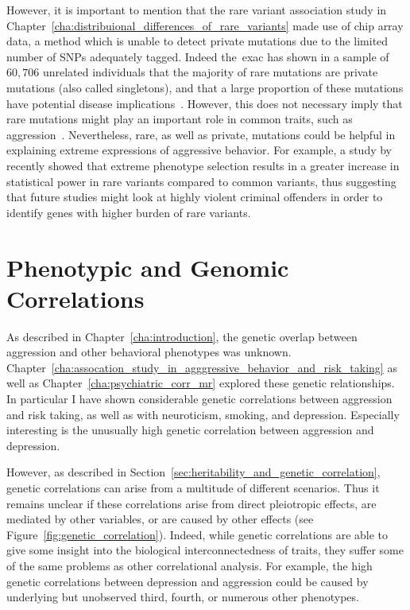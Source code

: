 However, it is important to mention that the rare variant association study in Chapter~\ref{cha:distribuional_differences_of_rare_variants} made use of chip array data, a method which is unable to detect private mutations due to the limited number of SNPs adequately tagged.
Indeed the~\acrfull{exac} has shown in a sample of $60,706$ unrelated individuals that the majority of rare mutations are private mutations (also called singletons), and that a large proportion of these mutations have potential disease implications~\cite{Lek2016,Kobayashi2017}.
However, this does not necessary imply that rare mutations might play an important role in common traits, such as aggression~\cite{Chabris2015}.
Nevertheless, rare, as well as private, mutations could be helpful in explaining extreme expressions of aggressive behavior.
For example, a study by~\cite{Peloso2016} recently showed that extreme phenotype selection results in a greater increase in statistical power in rare variants compared to common variants,
thus suggesting that future studies might look at highly violent criminal offenders in order to identify genes with higher burden of rare variants.

\section{Phenotypic and Genomic Correlations}
\label{sec:phenotypical_and_genomic_correlations}

As described in Chapter~\ref{cha:introduction}, the genetic overlap between aggression and other behavioral phenotypes was unknown.
Chapter~\ref{cha:assocation_study_in_agggressive_behavior_and_risk_taking} as well as Chapter~\ref{cha:psychiatric_corr_mr} explored these genetic relationships.
In particular I have shown considerable genetic correlations between aggression and risk taking, as well as with neuroticism, smoking, and depression. 
Especially interesting is the unusually high genetic correlation between aggression and depression.

However, as described in Section~\ref{sec:heritability_and_genetic_correlation}, genetic correlations can arise from a multitude of different scenarios.
Thus it remains unclear if these correlations arise from direct pleiotropic effects, are mediated by other variables, or are caused by other effects (see Figure~\ref{fig:genetic_correlation}). 
Indeed, while genetic correlations are able to give some insight into the biological interconnectedness of traits, they suffer some of the same problems as other correlational analysis. 
For example, the high genetic correlations between depression and aggression could be caused by underlying but unobserved third, fourth, or numerous other phenotypes.

